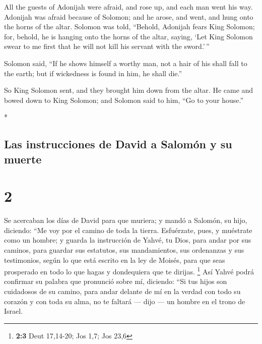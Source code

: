\begin{paracol}{2}
\begin{otherlanguage}{english}
 All the guests of Adonijah were afraid, and rose up, and
each man went his way.  Adonijah was afraid because of
Solomon; and he arose, and went, and hung onto the horns of the altar.
 Solomon was told, ``Behold, Adonijah fears King Solomon;
for, behold, he is hanging onto the horns of the altar, saying, `Let
King Solomon swear to me first that he will not kill his servant with
the sword.'\,''

 Solomon said, ``If he shows himself a worthy man, not a
hair of his shall fall to the earth; but if wickedness is found in him,
he shall die.''

 So King Solomon sent, and they brought him down from the
altar. He came and bowed down to King Solomon; and Solomon said to him,
``Go to your house.''

\end{otherlanguage}

\switchcolumn[0]*

\hypertarget{las-instrucciones-de-david-a-salomuxf3n-y-su-muerte}{%
\subsection{Las instrucciones de David a Salomón y su
muerte}\label{las-instrucciones-de-david-a-salomuxf3n-y-su-muerte}}

\hypertarget{section-2}{%
\section{2}\label{section-2}}

 Se acercaban los días de David para que muriera; y mandó
a Salomón, su hijo, diciendo:  ``Me voy por el camino de
toda la tierra. Esfuérzate, pues, y muéstrate como un hombre;
 y guarda la instrucción de Yahvé, tu Dios, para andar por
sus caminos, para guardar sus estatutos, sus mandamientos, sus
ordenanzas y sus testimonios, según lo que está escrito en la ley de
Moisés, para que seas prosperado en todo lo que hagas y dondequiera que
te dirijas. \footnote{\textbf{2:3} Deut 17,14-20; Jos 1,7; Jos 23,6}
 Así Yahvé podrá confirmar su palabra que pronunció sobre
mí, diciendo: ``Si tus hijos son cuidadosos de su camino, para andar
delante de mí en la verdad con todo su corazón y con toda su alma, no te
faltará --- dijo --- un hombre en el trono de Israel.


\end{paracol}
